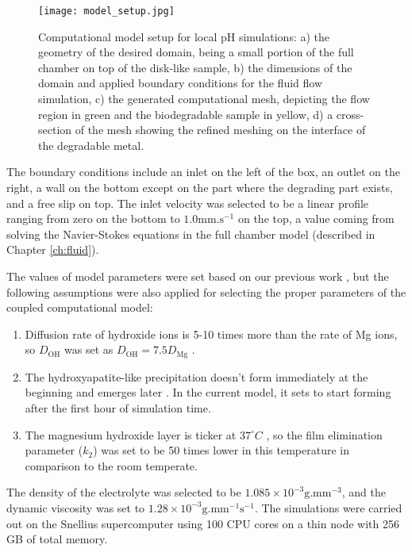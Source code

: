 \begin{figure}[h]
\centering
\medskip
\texttt{[image: model\_setup.jpg]}
\caption[Computational model setup for local pH simulations]{Computational model setup for local pH simulations: a) the geometry of the desired domain, being a small portion of the full chamber on top of the disk-like sample, b) the dimensions of the domain and applied boundary conditions for the fluid flow simulation, c) the generated computational mesh, depicting the flow region in green and the biodegradable sample in yellow, d) a cross-section of the mesh showing the refined meshing on the interface of the degradable metal.} \label{fig:kinetics_model_setup}
\end{figure}

The boundary conditions include an inlet on the left of the box, an outlet on the right, a wall on the bottom except on the part where the degrading part exists, and a free slip on top. The inlet velocity was selected to be a linear profile ranging from zero on the bottom to $1.0 \text{mm.s}^{-1}$ on the top, a value coming from solving the Navier-Stokes equations in the full chamber model (described in Chapter \ref{ch:fluid}).

The values of model parameters were set based on our previous work \cite{Barzegari2021}, but the following assumptions were also applied for selecting the proper parameters of the coupled computational model:
\begin{enumerate}
\item
Diffusion rate of hydroxide ions is 5-10 times more than the rate of Mg ions, so $D_{\mathrm{OH}}$ was set as $D_{\mathrm{OH}} = 7.5 D_{\mathrm{Mg}}$ \cite{Gonzalez2021}.
\item
The hydroxyapatite-like precipitation doesn't form immediately at the beginning and emerges later \cite{Gonzalez2021,Wang2022}. In the current model, it sets to start forming after the first hour of simulation time.
\item
The magnesium hydroxide layer is ticker at $37^{\circ}C$ \cite{Wang2022}, so the film elimination parameter ($k_2$) was set to be 50 times lower in this temperature in comparison to the room temperate.
\end{enumerate}

The density of the electrolyte was selected to be $1.085\times10^{-3} \text{g.mm}^{-3}$, and the dynamic viscosity was set to $1.28\times10^{-3} \text{g.mm}^{-1}\text{s}^{-1}$. The simulations were carried out on the Snellius supercomputer using 100 \gls{CPU} cores on a thin node with 256 GB of total memory.


